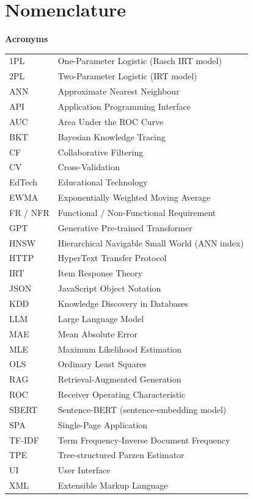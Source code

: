 \documentclass{article}
\numberwithin{figure}{section}
\numberwithin{table}{section}
\numberwithin{equation}{section}
\begin{document}
\newpage

\tableofcontents
    
\newpage

\listoffigures
\newpage

\listoftables
\newpage

\section*{Nomenclature}

\textbf{Acronyms}\\
\begin{tabular}{@{}p{}p{}@{}}
1PL      & One-Parameter Logistic (Rasch IRT model) \\
2PL      & Two-Parameter Logistic (IRT model) \\
ANN      & Approximate Nearest Neighbour \\
API      & Application Programming Interface \\
AUC      & Area Under the ROC Curve \\
BKT      & Bayesian Knowledge Tracing \\
CF       & Collaborative Filtering \\
CV       & Cross-Validation \\
EdTech   & Educational Technology \\
EWMA     & Exponentially Weighted Moving Average \\
FR / NFR & Functional / Non-Functional Requirement \\
GPT      & Generative Pre-trained Transformer \\
HNSW     & Hierarchical Navigable Small World (ANN index) \\
HTTP     & HyperText Transfer Protocol \\
IRT      & Item Response Theory \\
JSON     & JavaScript Object Notation \\
KDD      & Knowledge Discovery in Databases \\
LLM      & Large Language Model \\
MAE      & Mean Absolute Error \\
MLE      & Maximum Likelihood Estimation \\
OLS      & Ordinary Least Squares \\
RAG      & Retrieval-Augmented Generation \\
ROC      & Receiver Operating Characteristic \\
SBERT    & Sentence-BERT (sentence-embedding model) \\
SPA      & Single-Page Application \\
TF-IDF   & Term Frequency-Inverse Document Frequency \\
TPE      & Tree-structured Parzen Estimator \\
UI       & User Interface \\
XML      & Extensible Markup Language \\
\end{tabular}
\end{document}
